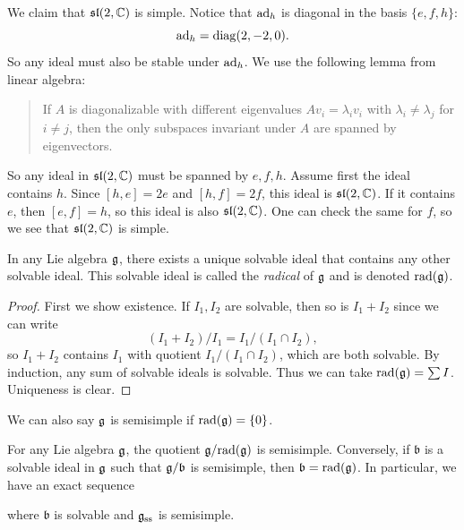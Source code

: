 \begin{example}
  We claim that $\mathfrak{sl}(2, \mathbb{C})$ is simple.
  Notice that $\operatorname{ad}_h$ is
  diagonal in the basis $\{e, f, h\}$:
  \[
    \operatorname{ad}_h = \operatorname{diag}(2, -2, 0).
  \]
  So any ideal must also be stable under
  $\operatorname{ad}_h$.
  We use the following lemma from
  linear algebra:
  \begin{quote}
    \vspace{-2em}
    \begin{lemma}
      If $A$ is diagonalizable with
      different eigenvalues
      $A v_i = \lambda_i v_i$
      with $\lambda_i \ne \lambda_j$ for
      $i \ne j$, then the only
      subspaces invariant under
      $A$ are spanned by eigenvectors.
    \end{lemma}
  \end{quote}
  So any ideal in $\mathfrak{sl}(2, \mathbb{C})$
  must be spanned by $e, f, h$.
  Assume first the ideal contains $h$.
  Since $[h, e] = 2e$ and
  $[h, f] = 2f$, this ideal is
  $\mathfrak{sl}(2, \mathbb{C})$. If it contains
  $e$, then $[e, f] = h$, so this ideal
  is also $\mathfrak{sl}(2, \mathbb{C})$.
  One can check the same for $f$, so
  we see that $\mathfrak{sl}(2, \mathbb{C})$ is
  simple.
\end{example}

\begin{prop}
  In any Lie algebra $\mathfrak{g}$, there exists a
  unique solvable ideal that contains any
  other solvable ideal. This solvable
  ideal is called the \emph{radical}
  of $\mathfrak{g}$ and is denoted $\operatorname{rad}(\mathfrak{g})$.
\end{prop}

\begin{proof}
  First we show existence. If
  $I_1, I_2$ are solvable, then so
  is $I_1 + I_2$ since we can write
  \[
    (I_1 + I_2) / I_1 = I_1 / (I_1 \cap I_2),
  \]
  so $I_1 + I_2$ contains $I_1$ with quotient
  $I_1 / (I_1 \cap I_2)$, which are both solvable.
  By induction, any sum of
  solvable ideals
  is solvable. Thus we can take
  $\operatorname{rad}(\mathfrak{g}) = \sum I$. Uniqueness is clear.
\end{proof}

\begin{remark}
  We can also say $\mathfrak{g}$  is semisimple
  if $\operatorname{rad}(\mathfrak{g}) = \{0\}$.
\end{remark}

\begin{theorem}
  For any Lie algebra $\mathfrak{g}$, the quotient
  $\mathfrak{g} / {\operatorname{rad}(\mathfrak{g})}$ is semisimple.
  Conversely, if $\mathfrak{b}$ is a
  solvable ideal in $\mathfrak{g}$ such that
  $\mathfrak{g} / \mathfrak{b}$ is semisimple,
  then $\mathfrak{b} = \operatorname{rad}(\mathfrak{g})$.
  In particular, we have an exact sequence
  \begin{center}
  \end{center}
  where $\mathfrak{b}$ is solvable and
  $\mathfrak{g}_{\mathrm{ss}}$ is semisimple.
\end{theorem}

